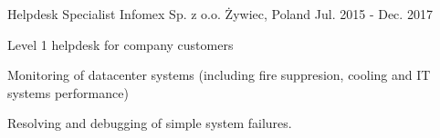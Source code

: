 \begin{cventries}
\cventry
  {Helpdesk Specialist} %
  {Infomex Sp. z o.o.} %
  {Żywiec, Poland} %
  {Jul. 2015 - Dec. 2017} %
  {
    \begin{cvitems} %
      \item {Level 1 helpdesk for company customers}
      \item {Monitoring of datacenter systems (including fire suppresion, cooling and IT systems performance)}
      \item {Resolving and debugging of simple system failures.}
    \end{cvitems}
  }

\end{cventries}
